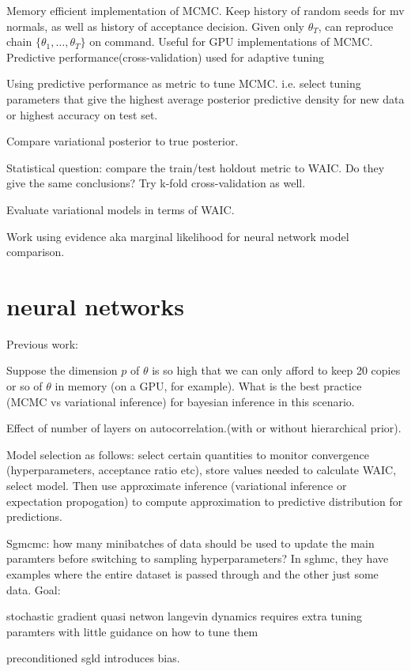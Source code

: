 \documentclass[12pt]{report}
\begin{document}
\begin{enumerate}
Memory efficient implementation of MCMC.
Keep history of random seeds for mv normals, as well as history of acceptance
decision.
Given only $\theta_T$, can reproduce chain $\{\theta_1, \dots, \theta_T \}$ on
command.
Useful for GPU implementations of MCMC.
Predictive performance(cross-validation) used for adaptive
tuning\cite{wang2013adaptive}


Using predictive performance as metric to tune MCMC. i.e. select tuning
parameters that give the highest average posterior predictive density for new
data or highest accuracy on test set.

Compare variational posterior to true posterior.  

Statistical question: compare the train/test holdout metric to WAIC. Do they
give the same conclusions?\cite{kohavi1995study}
Try k-fold cross-validation as well.

Evaluate variational models in terms of WAIC. 

Work using evidence aka marginal likelihood for neural network model comparison. 
\section{ neural networks}
Previous work:\cite{blundell2015weight}

Suppose the dimension $p$ of $\theta$ is so high that we can only afford to keep 20 copies or so of $\theta$ in memory (on a GPU, for example). 
What is the best practice (MCMC vs variational inference) for bayesian inference in this scenario. 

Effect of number of layers on autocorrelation.(with or without hierarchical prior).

Model selection as follows: select certain quantities to monitor convergence (hyperparameters, acceptance ratio etc), store values needed to calculate WAIC, select model. Then use approximate inference (variational inference or expectation propogation) to compute approximation to predictive distribution for predictions.

Sgmcmc: how many minibatches of data should be used to update the main paramters before switching to sampling hyperparameters? In sghmc, they have examples where the entire dataset is passed through and the other just some data.
Goal: 

stochastic gradient quasi netwon langevin dynamics requires extra tuning paramters with little guidance on how to tune them \cite{csimcsekli2016stochastic}

preconditioned sgld introduces bias\cite{li2015preconditioned}.


\end{enumerate}

\end{document}
